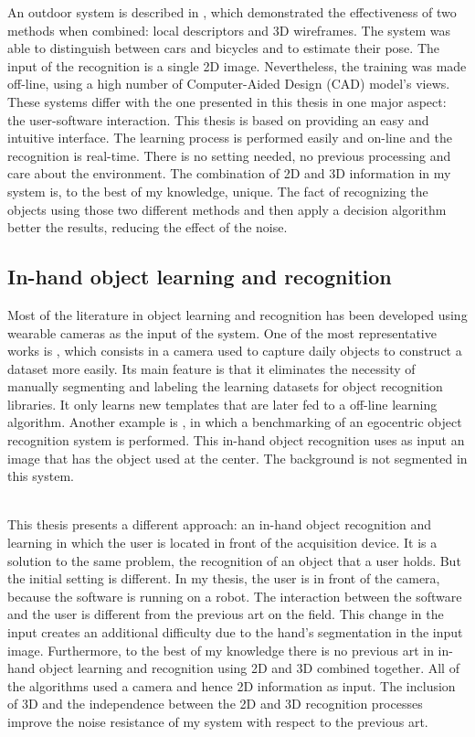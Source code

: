 An outdoor system is described in \cite{Zia2013}, which demonstrated the effectiveness of two methods when combined: local descriptors and 3D wireframes. 
The system was able to distinguish between cars and bicycles and to estimate their pose. 
The input of the recognition is a single 2D image. 
Nevertheless, the training was made off-line, using a high number of Computer-Aided Design (CAD) model's views. 
These systems differ with the one presented in this thesis in one major aspect: 
the user-software interaction. 
This thesis is based on providing an easy and intuitive interface. 
The learning process is performed easily and on-line and the recognition is real-time. 
There is no setting needed, no previous processing and care about the environment. 
The combination of 2D and 3D information in my system is, to the best of my knowledge, unique. 
The fact of recognizing the objects using those two different methods and then apply a decision algorithm better the results, reducing the effect of the noise.  



\subsection{In-hand object learning and recognition}

Most of the literature in object learning and recognition has been developed using wearable cameras as the input of the system. 
One of the most representative works is \cite{Roth2006}, which consists in a camera used to capture daily objects to construct a dataset more easily. 
Its main feature is that it eliminates the necessity of manually segmenting and labeling the learning datasets for object recognition libraries. 
It only learns new templates that are later fed to a off-line learning algorithm. 
Another example is \cite{Philipose2009}, in which a benchmarking of an egocentric object recognition system is performed. 
This in-hand object recognition uses as input an image that has the object used at the center. 
The background is not segmented in this system. 

\\

This thesis presents a different approach: an in-hand object recognition and learning in which the user is located in front of the acquisition device. 
It is a solution to the same problem, the recognition of an object that a user holds. 
But the initial setting is different. 
In my thesis, the user is in front of the camera, because the software is running on a robot. 
The interaction between the software and the user is different from the previous art on the field. 
This change in the input creates an additional difficulty due to the hand's segmentation in the input image. 
Furthermore, to the best of my knowledge there is no previous art in in-hand object learning and recognition using 2D and 3D combined together. 
All of the algorithms used a camera and hence 2D information as input. 
The inclusion of 3D and the independence between the 2D and 3D recognition processes improve the noise resistance of my system with respect to the previous art. 


